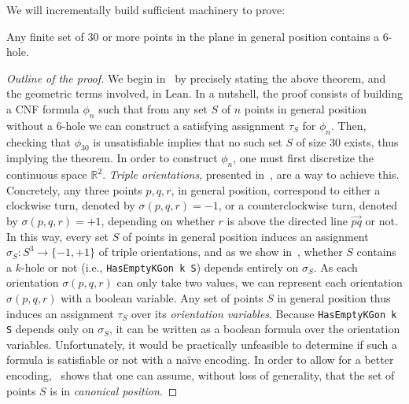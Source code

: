 We will incrementally build sufficient machinery to prove:

\begin{theorem*}
Any finite set of $30$ or more points in the plane in general position contains a $6$-hole.
\end{theorem*}

\begin{proof}[Outline of the proof]
We begin in~ by precisely stating the above theorem, and the geometric terms involved, in Lean. In a nutshell, the proof consists of building a CNF formula $\phi_n$ such that 
from any set $S$ of $n$ points in general position without a $6$-hole we can construct a satisfying assignment $\tau_S$ for $\phi_n$.
Then, checking that $\phi_{30}$ is unsatisfiable implies that no such set $S$ of size $30$ exists, thus implying the theorem. 
% 
In order to construct $\phi_n$, one must first discretize the continuous space $\mathbb{R}^2$. \emph{Triple orientations}, presented in~, are a way to achieve this. Concretely, any three points $p,q,r$, in general position, correspond to either a clockwise turn, denoted by $\sigma(p, q, r) = -1$, or a counterclockwise turn, denoted by $\sigma(p, q, r) = +1$, depending on whether $r$ is above the directed line $\overrightarrow{pq}$ or not. 
In this way, every set $S$ of points in general position induces an assignment $\sigma_S: S^3 \to \{-1,+1\}$
of triple orientations, and as we show in~, whether $S$ contains a $k$-hole or not (i.e., \lstinline|HasEmptyKGon k S|) depends entirely on $\sigma_S$. 
As each orientation $\sigma(p, q, r)$ can only take two values, we can represent each orientation $\sigma(p,q,r)$ with a boolean variable. Any set of points $S$ in general position thus induces an assignment $\tau_S$ over its \emph{orientation variables}. 
Because \lstinline|HasEmptyKGon k S| depends only on $\sigma_S$, it can be written as a boolean formula over the orientation variables.
% 
Unfortunately, it would be practically unfeasible to determine if such a formula is satisfiable or not with a naïve encoding.
In order to allow for a better encoding,~ shows that one can assume, without loss of generality, that the set of points $S$ is in \emph{canonical position}.

\end{proof}
